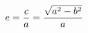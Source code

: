 \documentclass[preview]{standalone}
\begin{document}
\begin{align*}
\special{dvisvgm:raw <g id='unique000'>}e = \frac{c}{a} = \frac{\sqrt{a^2-b^2}}{a}\special{dvisvgm:raw </g>}
\end{align*}
\end{document}
